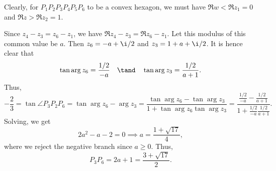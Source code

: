 \begin{solution}
\begin{ppart}
\begin{center}
        \end{center}

        Clearly, for $P_1 P_2 P_3 P_4 P_5 P_6$ to be a convex hexagon, we must have $\Re{w} < \Re{z_1} = 0$ and $\Re{z} > \Re{z_2} = 1$.
    \end{ppart}
    \begin{ppart}
        Since $z_4 - z_3 = z_6 - z_1$, we have $\Re{z_4 - z_3} = \Re{z_6 - z_1}$. Let this modulus of this common value be $a$. Then $z_6 = -a + \i/2$ and $z_3 = 1 + a + \i/2$. It is hence clear that \[\tan \arg z_6 = \frac{1/2}{-a} \quad \tand \quad \tan \arg z_3 = \frac{1/2}{a + 1}.\] Thus, \[-\frac23 = \tan \angle P_3 P_2 P_6 = \tan{\arg z_6 - \arg z_3} = \frac{\tan \arg z_6 - \tan \arg z_3}{1 + \tan \arg z_6 \tan \arg z_3} = \frac{\frac{1/2}{-a} - \frac{1/2}{a + 1}}{1 + \frac{1/2}{-a} \frac{1/2}{a + 1}}.\] Solving, we get \[2a^2 - a - 2 = 0 \implies a = \frac{1 + \sqrt{17}}{4},\] where we reject the negative branch since $a \geq 0$. Thus, \[P_3 P_6 = 2a + 1 = \frac{3 + \sqrt{17}}{2}.\]
    \end{ppart}
\end{solution}

